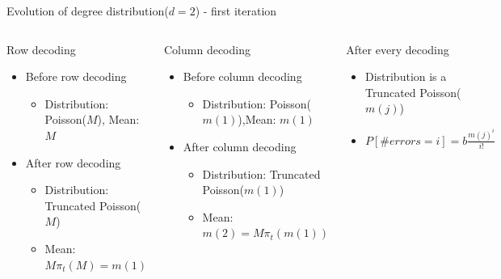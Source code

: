 \begin{frame}{Evolution of degree distribution($d=2$) - first iteration}
\vspace*{-6mm}
\begin{columns}

\begin{block}{Row decoding}
\begin{itemize}
\item Before row decoding
    \begin{itemize}
      \item {\color{blue}Distribution}: Poisson($M$), {\color{blue}Mean}: $M$
    \end{itemize}

\item After row decoding
    \begin{itemize}
      \item {\color{blue}Distribution}: Truncated Poisson($M$)
      \item {\color{blue}Mean}: $M \pi_t(M) = m(1)$
    \end{itemize}
\end{itemize}	
\end{block}

\begin{block}{Column decoding}
\begin{itemize}
\item Before column decoding
    \begin{itemize}
      \item {\color{blue}Distribution}: Poisson($m(1)$),{\color{blue}Mean}: $m(1)$
    \end{itemize}

\item After column decoding
    \begin{itemize}
      \item {\color{blue}Distribution}: Truncated Poisson($m(1)$)
      \item {\color{blue}Mean}: $m(2) = M \pi_t(m(1))$
    \end{itemize}
\end{itemize}	
\end{block}

\begin{block}{After every decoding}
\begin{itemize}
  \item Distribution is a Truncated Poisson($m(j)$)
  \item $P[\# errors = i] = b \frac{m(j)^i}{i!}$
\end{itemize}
\end{block}

\begin{center}
	\vspace{-3mm}
	
	
	
	
\end{center}

\end{columns}

\end{frame}
